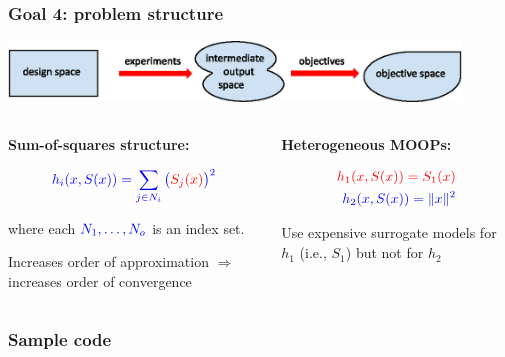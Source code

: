 \documentclass[aspectratio=169]{beamer}
\begin{document}
\begin{frame}\frametitle{Goal 4: problem structure}
\begin{center}
\includegraphics[width=0.9\textwidth]{obj-sim-des-space.eps}
\end{center}
\begin{columns}
\begin{column}{0.5\textwidth}
\pause
\textbf{Sum-of-squares structure:}

\medskip

{\large
$$
{\color{blue} h_i(x, S(x)) = \sum_{j \in N_i} \big({\color{red}S_j(x)}\big)^2}
$$

where each ${\color{blue} N_1, \ldots, N_o}$ is an index set.
}

\bigskip

Increases order of approximation $\Rightarrow$
increases order of convergence

\end{column}
\begin{column}{0.5\textwidth}
\pause
\textbf{Heterogeneous MOOPs:}

{\large
\begin{align*}
{\color{red} h_1(x, S(x)) = S_1(x)}\\
{\color{blue} h_2(x, S(x)) = \|x \|^2}
\end{align*}
}

Use expensive surrogate models for {\color{red} $h_1$} (i.e.,
{\color{red} $S_1$}) but not for {\color{blue} $h_2$}

\end{column}
\end{columns}
\end{frame}

\begin{frame}[fragile]\frametitle{Sample code}
  \lstset{style=python}
  
\end{frame}
\end{document}
